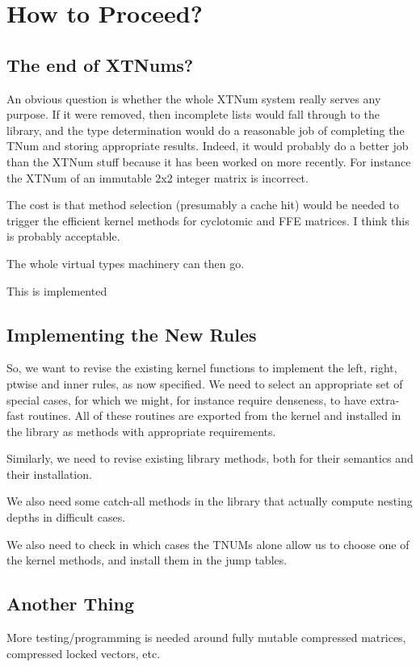 \documentclass{article}
\begin{document}
\section{How to Proceed?}

\subsection{The end of XTNums?}

An obvious question is whether the whole XTNum system really serves
any purpose.  If it were removed, then incomplete lists would fall
through to the library, and the type determination would do a
reasonable job of completing the TNum and storing appropriate
results. Indeed, it would probably do a better job than the XTNum
stuff because it has been worked on more recently. For instance the
XTNum of an immutable 2x2 integer matrix is incorrect. 

The cost is that method selection (presumably a cache hit) would be
needed to trigger the efficient kernel methods for cyclotomic and FFE
matrices. I think this is probably acceptable.

The whole virtual types machinery can then go.

This is implemented

\subsection{Implementing the New Rules}

So, we want to revise the existing kernel functions to implement the
left, right, ptwise and inner rules, as now specified. We need to
select an appropriate set of special cases, for which we might, for
instance require denseness, to have extra-fast routines. All of these
routines are exported from the kernel and installed in the library as
methods with appropriate requirements. 

Similarly, we need to revise existing library methods, both for their
semantics and their installation.

We also need some catch-all methods in the library that actually
compute nesting depths in difficult cases. 

We also need to check in which cases the TNUMs alone allow us to
choose one of the kernel methods, and install them in the jump tables.


\subsection{Another Thing}

More testing/programming is needed around fully mutable compressed
matrices, compressed locked vectors, etc.
\end{document}
